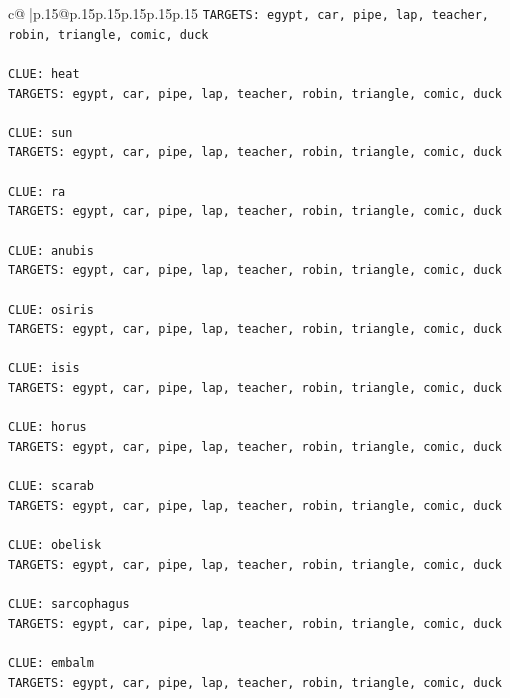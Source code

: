 \documentclass{article}
\begin{document}
{\begin{supertabular}{c@{$\;$}|p{.15\linewidth}@{}p{.15\linewidth}p{.15\linewidth}p{.15\linewidth}p{.15\linewidth}p{.15\linewidth}}
{{{\texttt{TARGETS: egypt, car, pipe, lap, teacher, robin, triangle, comic, duck} \\
\\ 
\texttt{CLUE: heat} \\
\texttt{TARGETS: egypt, car, pipe, lap, teacher, robin, triangle, comic, duck} \\
\\ 
\texttt{CLUE: sun} \\
\texttt{TARGETS: egypt, car, pipe, lap, teacher, robin, triangle, comic, duck} \\
\\ 
\texttt{CLUE: ra} \\
\texttt{TARGETS: egypt, car, pipe, lap, teacher, robin, triangle, comic, duck} \\
\\ 
\texttt{CLUE: anubis} \\
\texttt{TARGETS: egypt, car, pipe, lap, teacher, robin, triangle, comic, duck} \\
\\ 
\texttt{CLUE: osiris} \\
\texttt{TARGETS: egypt, car, pipe, lap, teacher, robin, triangle, comic, duck} \\
\\ 
\texttt{CLUE: isis} \\
\texttt{TARGETS: egypt, car, pipe, lap, teacher, robin, triangle, comic, duck} \\
\\ 
\texttt{CLUE: horus} \\
\texttt{TARGETS: egypt, car, pipe, lap, teacher, robin, triangle, comic, duck} \\
\\ 
\texttt{CLUE: scarab} \\
\texttt{TARGETS: egypt, car, pipe, lap, teacher, robin, triangle, comic, duck} \\
\\ 
\texttt{CLUE: obelisk} \\
\texttt{TARGETS: egypt, car, pipe, lap, teacher, robin, triangle, comic, duck} \\
\\ 
\texttt{CLUE: sarcophagus} \\
\texttt{TARGETS: egypt, car, pipe, lap, teacher, robin, triangle, comic, duck} \\
\\ 
\texttt{CLUE: embalm} \\
\texttt{TARGETS: egypt, car, pipe, lap, teacher, robin, triangle, comic, duck} \\
}}}
\end{supertabular}}
\end{document}
